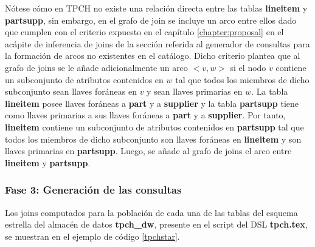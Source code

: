 N\'otese c\'omo en TPCH no existe una relaci\'on directa entre las tablas \textbf{lineitem} y \textbf{partsupp}, 
sin embargo, en el grafo de join se incluye un arco entre ellos dado que cumplen con el criterio expuesto 
en el cap\'itulo \ref{chapter:proposal} en el ac\'apite de inferencia de joins de la sección referida al 
generador de consultas para la formaci\'on de arcos no existentes en el cat\'alogo. Dicho criterio 
plantea que al grafo de joins se le añade adicionalmente un arco $<v, w>$ si el nodo $v$ contiene un subconjunto 
de atributos contenidos en $w$ tal que todos los miembros de dicho subconjunto sean llaves for\'aneas en $v$
y sean llaves primarias en $w$. La tabla \textbf{lineitem} posee llaves for\'aneas a \textbf{part} y a 
\textbf{supplier} y la tabla \textbf{partsupp} tiene como llaves primarias a sus llaves for\'aneas a \textbf{part} 
y a \textbf{supplier}. Por tanto, \textbf{lineitem} contiene un subconjunto 
de atributos contenidos en \textbf{partsupp} tal que todos los miembros de dicho subconjunto son llaves for\'aneas en \textbf{lineitem}
y son llaves primarias en \textbf{partsupp}. Luego, se añade al grafo de joins el arco entre \textbf{lineitem} y 
\textbf{partsupp}.

\subsubsection{Fase 3: Generaci\'on de las consultas}

Los joins computados para la poblaci\'on de cada una de las tablas del esquema estrella del almacén de datos 
\textbf{tpch\_dw}, presente en el script del DSL \textbf{tpch.tex}, se muestran en el ejemplo de código \ref{tpchstar}. 

